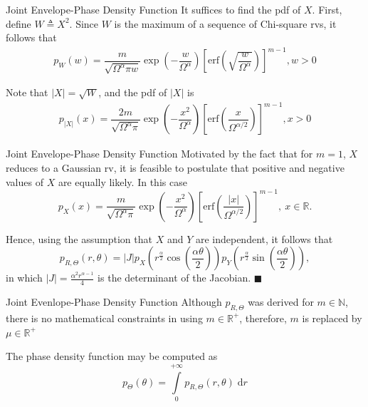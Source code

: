\documentclass[aspectratio=169]{beamer}
\begin{document}
\begin{frame}{Joint Envelope-Phase Density Function}
    It suffices to find the pdf of $X$. First, define $W \triangleq X^2$. Since $W$ is the maximum of a sequence of Chi-square rvs, it follows that
\begin{align*}
p_{W}(w) = \dfrac{m}{\sqrt{\Omega^{\alpha}\pi w}}\exp\left(-\dfrac{w}{\Omega^\alpha}\right)\left[\mathrm{erf}\left(\sqrt{\dfrac{w}{\Omega^\alpha}}\right)\right]^{m-1}, w>0
\end{align*}

Note that $|X| = \sqrt{W}$, and the pdf of $|X|$ is
\begin{align*}
p_{|X|}(x) = \dfrac{2m}{\sqrt{\Omega^\alpha\pi}}\exp\left(-\dfrac{x^2}{\Omega^\alpha}\right)\left[\mathrm{erf}\left(\dfrac{x}{\Omega^{\alpha/2}}\right)\right]^{m-1}, x>0
\end{align*}
\end{frame}

\begin{frame}{Joint Envelope-Phase Density Function}
Motivated by the fact that for $m=1$, $X$ reduces to a Gaussian rv, it is feasible to postulate that positive and negative values of $X$ are equally likely. In this case
\begin{equation*}
p_{X}(x) = \dfrac{m}{\sqrt{\Omega^\alpha\pi}}\exp\left(-\dfrac{x^2}{\Omega^\alpha}\right)\left[\mathrm{erf}\left(\dfrac{|x|}{\Omega^{\alpha/2}}\right)\right]^{m-1},~x\in\mathbb{R}.
\end{equation*}

Hence, using the assumption that $X$ and $Y$ are independent, it follows that
\begin{equation*}
p_{R,\Theta}(r,\theta) = |J|p_{X}\left(r^{\frac{\alpha}{2}}\cos\left(\frac{\alpha\theta}{2}\right)\right)p_{Y}\left(r^\frac{\alpha}{2}\sin\left(\frac{\alpha\theta}{2}\right)\right),
\end{equation*}
in which $|J| = \frac{\alpha^2r^{\alpha-1}}{4}$ is the determinant of the Jacobian. \hfill$\blacksquare$
\end{frame}


\begin{frame}{Joint Evenlope-Phase Density Function}
Although $p_{R,\Theta}$ was derived for $m \in \mathbb{N}$, there is no mathematical constraints in using $m \in \mathbb{R}^{+}$, therefore, $m$ is replaced by $\mu \in \mathbb{R}^{+}$

The phase density function may be computed as
    \begin{equation*}
        p_{\Theta}(\theta) = \int\limits_{0}^{+\infty} p_{R,\Theta}(r,\theta) \; \mathrm{d}r
    \end{equation*}
\end{frame}
\end{document}
